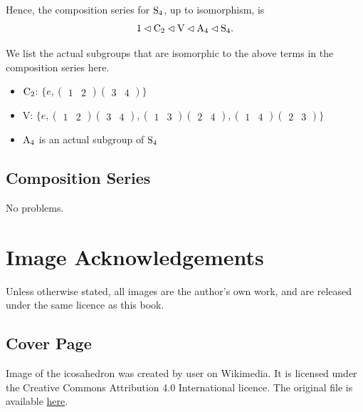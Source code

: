 \begin{enumerate}
    Hence, the composition series for $\mathrm{S}_{4}$, up to isomorphism, is
    \[
        1 \lhd \mathrm{C}_{2} \lhd \mathrm{V} \lhd \mathrm{A}_{4} \lhd \mathrm{S}_{4}.   
    \]
    \begin{remark}
        We list the actual subgroups that are isomorphic to the above terms in the composition series here.
        \begin{itemize}
            \item $\mathrm{C}_{2}$: $\{e, \begin{pmatrix}1&2\end{pmatrix}\begin{pmatrix}3&4\end{pmatrix}\}$
            \item V: $\{e, \begin{pmatrix}1&2\end{pmatrix}\begin{pmatrix}3&4\end{pmatrix}, \begin{pmatrix}1&3\end{pmatrix}\begin{pmatrix}2&4\end{pmatrix}, \begin{pmatrix}1&4\end{pmatrix}\begin{pmatrix}2&3\end{pmatrix}\}$
            \item $\mathrm{A}_{4}$ is an actual subgroup of $\mathrm{S}_{4}$
        \end{itemize}
    \end{remark}
\end{enumerate}

\section{Composition Series}
No problems.

\chapter{Image Acknowledgements}
Unless otherwise stated, all images are the author's own work, and are released under the same licence as this book.

\section{Cover Page}
Image of the icosahedron was created by user  on Wikimedia. It is licensed under the Creative Commons Attribution 4.0 International licence. The original file is available \href{https://commons.wikimedia.org/wiki/File:Icosahedron_with_colored_vertices.png}{here}.

